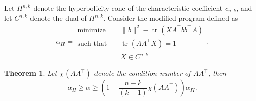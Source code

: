 \documentclass[a4paper]{article}
\newtheorem{theorem}{Theorem}
\DeclareMathOperator*{\tr}{tr}
\begin{document}
Let $H^{n,k}$ denote the hyperbolicity cone of the characteristic coefficient $c_{n,k}$, and let $C^{n,k}$ denote the dual of $H^{n,k}$.
Consider the modified program defined as 
\begin{equation}\label{eq:tight}
    \alpha_H = 
\begin{aligned}
    \text{minimize} &&\|b\|^2 - \tr(XA^{\intercal}bb^{\intercal}A)\\
    \text{such that } && \tr(AA^{\intercal}X) = 1\\
                      && X \in C^{n,k}
\end{aligned}.
\end{equation}
\begin{theorem}
    Let $\chi(AA^{\intercal})$ denote the condition number of $AA^{\intercal}$, then
   \[
       \alpha_H \ge \alpha \ge  (1+\frac{n-k}{(k-1)}\chi(AA^{\intercal}))\alpha_H.
   \]
\end{theorem}
\end{document}
